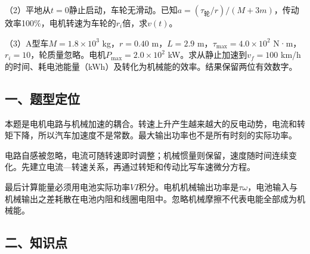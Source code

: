 \documentclass[12pt,a4paper,fontset=fandol]{ctexart}
\begin{document}
\begin{center}
\begin{minipage}{\linewidth}
\centering\begingroup{}
\ifdim\wd\diagrambox>.88\linewidth
\sbox{\diagrambox}{\resizebox{.88\linewidth}{!}{\usebox{\diagrambox}}}\fi
\ifdim\ht\diagrambox>.38\textheight
\resizebox{!}{.38\textheight}{\usebox{\diagrambox}}
\else\usebox{\diagrambox}\fi
\par{}\endgroup\end{minipage}\end{center}

（2）平地从\(t=0\)静止启动，车轮无滑动。已知\(a=(\tau_{\text{轮}}/r)/(M+3m)\)，传动效率100\%，电机转速为车轮的\(r_i\)倍，求\(v(t)\)。

（3）A型车\(M=1.8\times10^3\) kg，\(r=0.40\) m，\(L=2.9\)
m，\(\tau_{\max}=4.0\times10^2\)
N·m，\(r_i=10\)，轮质量忽略。电机\(P_{\max}=2.0\times10^2\)
kW。求从静止加速到\(v_f=100\)
km/h的时间、耗电池能量（kWh）及转化为机械能的效率。结果保留两位有效数字。

\subsection{一、题型定位}\label{ux4e00ux9898ux578bux5b9aux4f4d-7}

本题是电机电路与机械加速的耦合。转速上升产生越来越大的反电动势，电流和转矩下降，所以汽车加速度不是常数。最大输出功率也不是所有时刻的实际功率。

电路自感被忽略，电流可随转速即时调整；机械惯量则保留，速度随时间连续变化。先建立电流---转速关系，再通过转矩和传动比写车速微分方程。

最后计算能量必须用电池实际功率\(VI\)积分。电机机械输出功率是\(\tau\omega\)，电池输入与机械输出之差耗散在电池内阻和线圈电阻中。忽略机械摩擦不代表电能全部成为机械能。

\subsection{二、知识点}\label{ux4e8cux77e5ux8bc6ux70b9-7}
\end{document}
